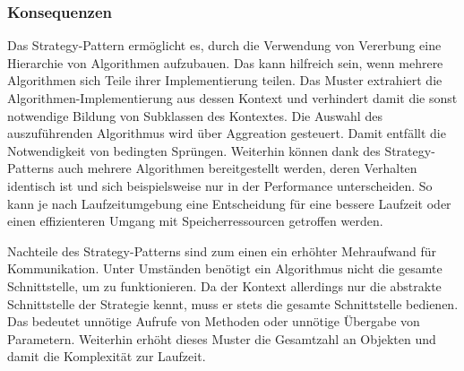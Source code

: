 \subsubsection*{Konsequenzen}
Das Strategy-Pattern ermöglicht es, durch die Verwendung von Vererbung eine Hierarchie von Algorithmen aufzubauen. Das kann hilfreich sein, wenn mehrere Algorithmen sich Teile ihrer Implementierung teilen. Das Muster extrahiert die Algorithmen-Implementierung aus dessen Kontext und verhindert damit die sonst notwendige Bildung von Subklassen des Kontextes. Die Auswahl des auszuführenden Algorithmus wird über Aggreation gesteuert. Damit entfällt die Notwendigkeit von bedingten Sprüngen. Weiterhin können dank des Strategy-Patterns auch mehrere Algorithmen bereitgestellt werden, deren Verhalten identisch ist und sich beispielsweise nur in der Performance unterscheiden. So kann je nach Laufzeitumgebung eine Entscheidung für eine bessere Laufzeit oder einen effizienteren Umgang mit Speicherressourcen getroffen werden.

Nachteile des Strategy-Patterns sind zum einen ein erhöhter Mehraufwand für Kommunikation. Unter Umständen benötigt ein Algorithmus nicht die gesamte Schnittstelle, um zu funktionieren. Da der Kontext allerdings nur die abstrakte Schnittstelle der Strategie kennt, muss er stets die gesamte Schnittstelle bedienen. Das bedeutet unnötige Aufrufe von Methoden oder unnötige Übergabe von Parametern. Weiterhin erhöht dieses Muster die Gesamtzahl an Objekten und damit die Komplexität zur Laufzeit. \cite{gamma_design_1995}